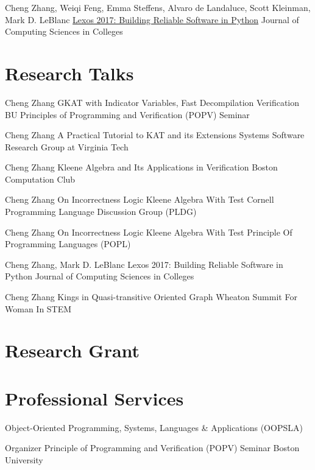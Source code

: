\documentclass[10pt]{moderncv}        %
\let\oldsection=\section
\renewcommand{\section}{%
  \needspace{\baselineskip}
  \oldsection
}
\begin{document}
{Cheng Zhang, Weiqi Feng, Emma Steffens, Alvaro de Landaluce, Scott Kleinman, Mark D. LeBlanc}
{\href{https://dl.acm.org/doi/10.5555/3205191.3205205}{Lexos 2017: Building Reliable Software in Python}}
{Journal of Computing Sciences in Colleges}
{}{}


\section{Research Talks}

{Cheng Zhang}
{GKAT with Indicator Variables, Fast Decompilation Verification}
{BU Principles of Programming and Verification (POPV) Seminar}
{}{}

{Cheng Zhang}
{A Practical Tutorial to KAT and its Extensions}
{Systems Software Research Group at Virginia Tech}
{}{}

{Cheng Zhang}
{Kleene Algebra and Its Applications in Verification}
{Boston Computation Club}
{}{}

{Cheng Zhang}
{On Incorrectness Logic Kleene Algebra With Test}
{Cornell Programming Language Discussion Group (PLDG)}
{}{}

{Cheng Zhang}
{On Incorrectness Logic Kleene Algebra With Test}
{Principle Of Programming Languages (POPL)}
{}{}

{Cheng Zhang, Mark D. LeBlanc}
{Lexos 2017: Building Reliable Software in Python}
{Journal of Computing Sciences in Colleges}
{}{}

{Cheng Zhang}
{Kings in Quasi-transitive Oriented Graph}
{Wheaton Summit For Woman In STEM}
{}{}

\section{Research Grant}



\section{Professional Services}

{Object-Oriented Programming, Systems, Languages \& Applications (OOPSLA)}{}{}{}

{Organizer}
{Principle of Programming and Verification (POPV) Seminar}
{Boston University}{}
{%
}
\end{document}
